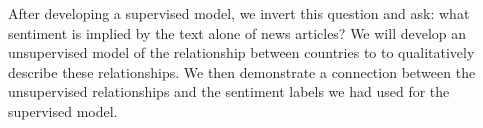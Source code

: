 After developing a supervised model, we invert this question and ask:
what sentiment is implied by the text alone of news articles?  We will
develop an unsupervised model of the relationship between countries to
to qualitatively describe these relationships.  We then demonstrate a
connection between the unsupervised relationships and the sentiment
labels we had used for the supervised model.
